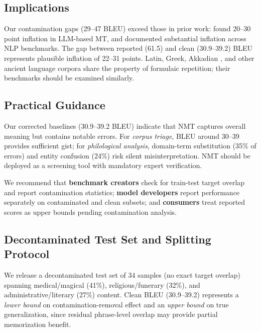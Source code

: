 \documentclass[11pt,a4paper]{article}
\begin{document}
\subsection{Implications}
\label{sec:discussion-implications}

Our contamination gaps (29--47 BLEU) exceed those in prior work: \citet{kocyigit2025overestimation} found 20--30 point inflation in LLM-based MT, and \citet{magar2022data} documented substantial inflation across NLP benchmarks. The gap between reported (61.5) and clean (30.9--39.2) BLEU represents plausible inflation of 22--31 points. Latin, Greek, Akkadian \citep{gutherz2023translating}, and other ancient language corpora share the property of formulaic repetition; their benchmarks should be examined similarly.

\subsection{Practical Guidance}
\label{sec:discussion-practical}

Our corrected baselines (30.9--39.2 BLEU) indicate that NMT captures overall meaning but contains notable errors. For \textit{corpus triage}, BLEU around 30--39 provides sufficient gist; for \textit{philological analysis}, domain-term substitution (35\% of errors) and entity confusion (24\%) risk silent misinterpretation. NMT should be deployed as a screening tool with mandatory expert verification.

We recommend that \textbf{benchmark creators} check for train-test target overlap and report contamination statistics; \textbf{model developers} report performance separately on contaminated and clean subsets; and \textbf{consumers} treat reported scores as upper bounds pending contamination analysis.

\subsection{Decontaminated Test Set and Splitting Protocol}
\label{sec:discussion-clean}

We release a decontaminated test set of 34 samples (no exact target overlap) spanning medical/magical (41\%), religious/funerary (32\%), and administrative/literary (27\%) content. Clean BLEU (30.9--39.2) represents a \textit{lower bound} on contamination-removal effect and an \textit{upper bound} on true generalization, since residual phrase-level overlap may provide partial memorization benefit.
\end{document}
